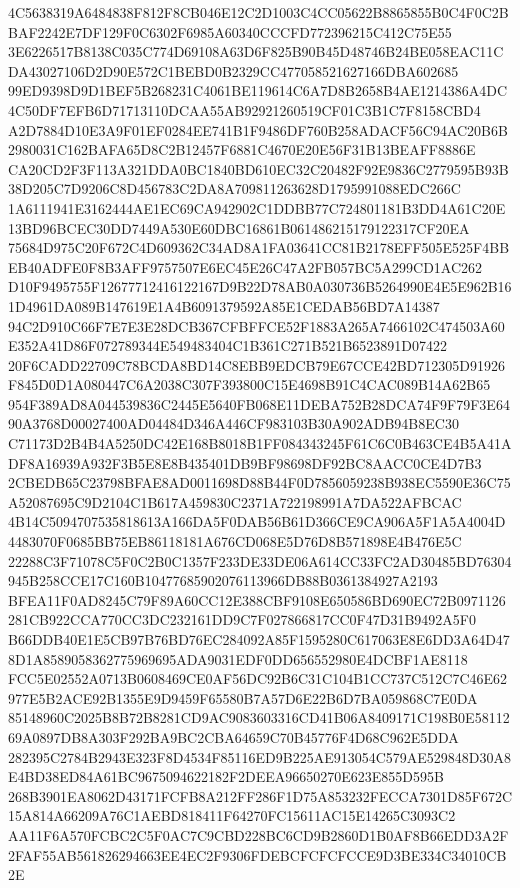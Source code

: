 \documentclass[UTF8,fontset=fandol,zihao=-4,a4paper]{ctexart}
\begin{document}
{{4C5638319A6484838F812F8CB046E12C2D1003C4CC05622B8865855B0C4F0C2BBAF2242E7DF129F0C6302F6985A60340CCCFD772396215C412C75E55
3E6226517B8138C035C774D69108A63D6F825B90B45D48746B24BE058EAC11CDA43027106D2D90E572C1BEBD0B2329CC477058521627166DBA602685
99ED9398D9D1BEF5B268231C4061BE119614C6A7D8B2658B4AE1214386A4DC4C50DF7EFB6D71713110DCAA55AB92921260519CF01C3B1C7F8158CBD4
A2D7884D10E3A9F01EF0284EE741B1F9486DF760B258ADACF56C94AC20B6B2980031C162BAFA65D8C2B12457F6881C4670E20E56F31B13BEAFF8886E
CA20CD2F3F113A321DDA0BC1840BD610EC32C20482F92E9836C2779595B93B38D205C7D9206C8D456783C2DA8A709811263628D1795991088EDC266C
1A6111941E3162444AE1EC69CA942902C1DDBB77C724801181B3DD4A61C20E13BD96BCEC30DD7449A530E60DBC16861B061486215179122317CF20EA
75684D975C20F672C4D609362C34AD8A1FA03641CC81B2178EFF505E525F4BBEB40ADFE0F8B3AFF9757507E6EC45E26C47A2FB057BC5A299CD1AC262
D10F9495755F12677712416122167D9B22D78AB0A030736B5264990E4E5E962B161D4961DA089B147619E1A4B6091379592A85E1CEDAB56BD7A14387
94C2D910C66F7E7E3E28DCB367CFBFFCE52F1883A265A7466102C474503A60E352A41D86F072789344E549483404C1B361C271B521B6523891D07422
20F6CADD22709C78BCDA8BD14C8EBB9EDCB79E67CCE42BD712305D91926F845D0D1A080447C6A2038C307F393800C15E4698B91C4CAC089B14A62B65
954F389AD8A044539836C2445E5640FB068E11DEBA752B28DCA74F9F79F3E6490A3768D00027400AD04484D346A446CF983103B30A902ADB94B8EC30
C71173D2B4B4A5250DC42E168B8018B1FF084343245F61C6C0B463CE4B5A41ADF8A16939A932F3B5E8E8B435401DB9BF98698DF92BC8AACC0CE4D7B3
2CBEDB65C23798BFAE8AD0011698D88B44F0D7856059238B938EC5590E36C75A52087695C9D2104C1B617A459830C2371A722198991A7DA522AFBCAC
4B14C5094707535818613A166DA5F0DAB56B61D366CE9CA906A5F1A5A4004D4483070F0685BB75EB86118181A676CD068E5D76D8B571898E4B476E5C
22288C3F71078C5F0C2B0C1357F233DE33DE06A614CC33FC2AD30485BD76304945B258CCE17C160B10477685902076113966DB88B0361384927A2193
BFEA11F0AD8245C79F89A60CC12E388CBF9108E650586BD690EC72B0971126281CB922CCA770CC3DC232161DD9C7F027866817CC0F47D31B9492A5F0
B66DDB40E1E5CB97B76BD76EC284092A85F1595280C617063E8E6DD3A64D478D1A8589058362775969695ADA9031EDF0DD656552980E4DCBF1AE8118
FCC5E02552A0713B0608469CE0AF56DC92B6C31C104B1CC737C512C7C46E62977E5B2ACE92B1355E9D9459F65580B7A57D6E22B6D7BA059868C7E0DA
85148960C2025B8B72B8281CD9AC9083603316CD41B06A8409171C198B0E5811269A0897DB8A303F292BA9BC2CBA64659C70B45776F4D68C962E5DDA
282395C2784B2943E323F8D4534F85116ED9B225AE913054C579AE529848D30A8E4BD38ED84A61BC9675094622182F2DEEA96650270E623E855D595B
268B3901EA8062D43171FCFB8A212FF286F1D75A853232FECCA7301D85F672C15A814A66209A76C1AEBD818411F64270FC15611AC15E14265C3093C2
AA11F6A570FCBC2C5F0AC7C9CBD228BC6CD9B2860D1B0AF8B66EDD3A2F2FAF55AB561826294663EE4EC2F9306FDEBCFCFCFCCE9D3BE334C34010CB2E
}}
\end{document}

